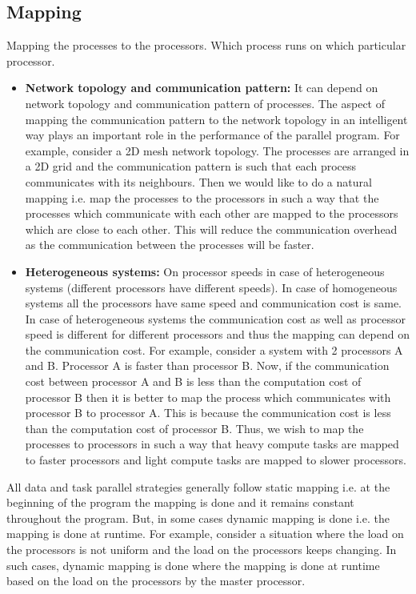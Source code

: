 \documentclass[12pt]{book}
\begin{document}
\subsection{Mapping}
Mapping the processes to the processors. 
Which process runs on which particular processor.
\begin{itemize}
    \item \textbf{Network topology and communication pattern: }It can depend on network topology and communication pattern of processes. The aspect of mapping the communication pattern to the network topology in an intelligent way plays an important role in the performance of the parallel program.
          For example, consider a 2D mesh network topology. The processes are arranged in a 2D grid and the communication pattern is such that each process communicates with its neighbours. Then we would like to do a natural mapping i.e. map the 
            processes to the processors in such a way that the processes which communicate with each other are mapped to the processors which are close to each other. This will reduce the communication overhead as the communication between the processes will be faster.
          
    \item \textbf{Heterogeneous systems: }On processor speeds in case of heterogeneous systems (different processors have different speeds). In case of homogeneous systems all the processors have same speed and communication cost is same.
          In case of heterogeneous systems the communication cost as well as processor speed is different for different processors and thus the mapping can depend on the communication cost. For example, consider a system with 2 processors A and B. Processor A is faster than processor B.
            Now, if the communication cost between processor A and B is less than the computation cost of processor B then it is better to map the process which communicates with processor B to processor A. This is because the communication cost is less than the computation cost of processor B. Thus, we wish to map the processes 
            to processors in such a way that heavy compute tasks are mapped to faster processors and light compute tasks are mapped to slower processors.
\end{itemize}
All data and task parallel strategies generally follow static mapping i.e. at the beginning of the program the mapping is done and it remains constant throughout the program.
But, in some cases dynamic mapping is done i.e. the mapping is done at runtime. For example, consider a situation where the load on the processors is not uniform and the load on the processors keeps changing. In such cases, dynamic mapping is done where the mapping is done at runtime based on the load on the processors by the master processor.
\end{document}
